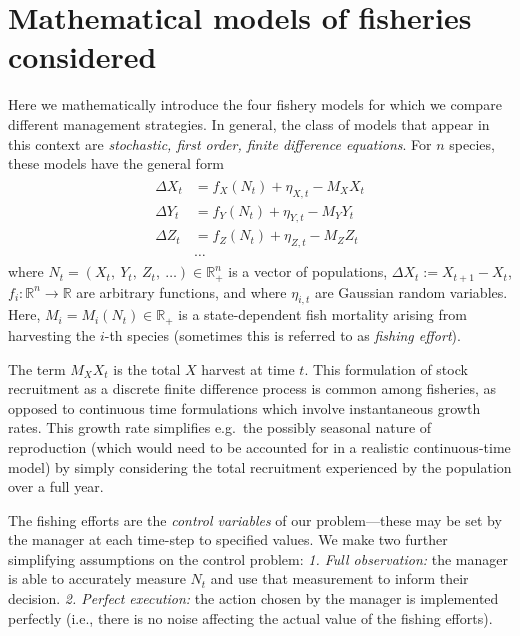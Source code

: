 \documentclass{article}
\begin{document}
\hypertarget{mathematical-models-of-fisheries-considered}{%
\section{Mathematical models of fisheries
considered}\label{mathematical-models-of-fisheries-considered}}

Here we mathematically introduce the four fishery models for which we
compare different management strategies. In general, the class of models
that appear in this context are \emph{stochastic, first order, finite
difference equations}. For \(n\) species, these models have the general
form \begin{align}
  \label{eq:general model}
  \begin{split}
    \Delta X_t &= f_X(N_t) + \eta_{X,t} - M_X X_t\\
    \Delta Y_t &= f_Y(N_t) + \eta_{Y,t} - M_Y Y_t\\
    \Delta Z_t &= f_Z(N_t) + \eta_{Z,t} - M_Z Z_t\\
    &\dots
  \end{split}
\end{align} where
\(N_t = (X_t,\ Y_t,\ Z_t,\ \dots) \in \mathbb{R}^{n}_+\) is a vector of
populations, \(\Delta X_t := X_{t+1} - X_t\),
\(f_i:\mathbb{R}^{n}\to\mathbb{R}\) are arbitrary functions, and where
\(\eta_{i,t}\) are Gaussian random variables. Here,
\(M_i=M_i(N_t)\in\mathbb{R}_+\) is a state-dependent fish mortality
arising from harvesting the \(i\)-th species (sometimes this is referred
to as \emph{fishing effort}).

The term \(M_X X_t\) is the total \(X\) harvest at time \(t\). This
formulation of stock recruitment as a discrete finite difference process
is common among fisheries, as opposed to continuous time formulations
which involve instantaneous growth rates. This growth rate simplifies
e.g.~the possibly seasonal nature of reproduction (which would need to
be accounted for in a realistic continuous-time model) by simply
considering the total recruitment experienced by the population over a
full year.

The fishing efforts are the \emph{control variables} of our
problem---these may be set by the manager at each time-step to specified
values. We make two further simplifying assumptions on the control
problem: \emph{1. Full observation:} the manager is able to accurately
measure \(N_t\) and use that measurement to inform their decision.
\emph{2. Perfect execution:} the action chosen by the manager is
implemented perfectly (i.e., there is no noise affecting the actual
value of the fishing efforts).
\end{document}
